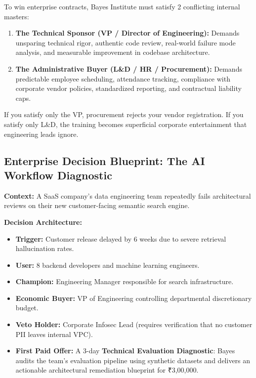 To win enterprise contracts, Bayes Institute must satisfy 2 conflicting internal masters:
\begin{enumerate}[leftmargin=1.2em,itemsep=0.2ex]
  \item \textbf{The Technical Sponsor (VP / Director of Engineering):} Demands unsparing technical rigor, authentic code review, real-world failure mode analysis, and measurable improvement in codebase architecture.
  \item \textbf{The Administrative Buyer (L\&D / HR / Procurement):} Demands predictable employee scheduling, attendance tracking, compliance with corporate vendor policies, standardized reporting, and contractual liability caps.
\end{enumerate}
If you satisfy only the VP, procurement rejects your vendor registration. If you satisfy only L\&D, the training becomes superficial corporate entertainment that engineering leads ignore.

\subsection{Enterprise Decision Blueprint: The AI Workflow Diagnostic}

\noindent\textbf{Context:} A SaaS company's data engineering team repeatedly fails architectural reviews on their new customer-facing semantic search engine.

\noindent\textbf{Decision Architecture:}
\begin{itemize}[leftmargin=1.2em,itemsep=0.2ex]
  \item \textbf{Trigger:} Customer release delayed by 6 weeks due to severe retrieval hallucination rates.
  \item \textbf{User:} 8 backend developers and machine learning engineers.
  \item \textbf{Champion:} Engineering Manager responsible for search infrastructure.
  \item \textbf{Economic Buyer:} VP of Engineering controlling departmental discretionary budget.
  \item \textbf{Veto Holder:} Corporate Infosec Lead (requires verification that no customer PII leaves internal VPC).
  \item \textbf{First Paid Offer:} A 3-day \textbf{Technical Evaluation Diagnostic}: Bayes audits the team's evaluation pipeline using synthetic datasets and delivers an actionable architectural remediation blueprint for ₹3,00,000.
\end{itemize}

